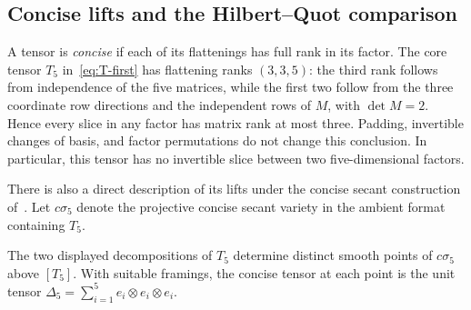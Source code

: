 \subsection{Concise lifts and the Hilbert--Quot comparison}
\label{bound:moduli-subsection}

A tensor is \emph{concise} if each of its flattenings has full rank in
its factor. The core tensor $T_5$ in~\eqref{eq:T-first}
has flattening ranks $(3,3,5)$: the third rank follows from independence
of the five matrices, while the first two follow from the three
coordinate row directions and the independent rows of $M$, with
$\det M=2$. Hence every slice in any factor has matrix rank at most
three. Padding, invertible changes of basis, and factor permutations
do not change this conclusion. In particular, this tensor has no
invertible slice between two five-dimensional factors.

There is also a direct description of its lifts under the concise
secant construction of~\cite{JagiellaJelisiejew2026}. Let $c\sigma_5$
denote the projective concise secant variety in the ambient format
containing $T_5$.

\begin{proposition}\label{bound:smooth-lifts}
The two displayed decompositions of $T_5$ determine distinct smooth
points of $c\sigma_5$ above $[T_5]$. With suitable framings, the concise
tensor at each point is the unit tensor
$\Delta_5=\sum_{i=1}^5e_i\otimes e_i\otimes e_i$.
\end{proposition}

